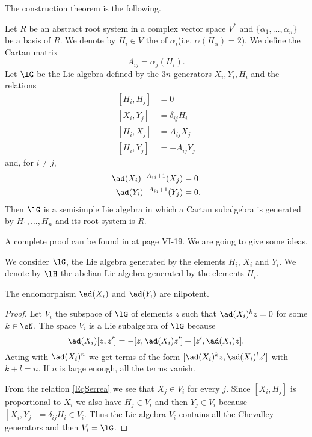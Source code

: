 The construction theorem is the following.
\begin{theorem}
	Let \( R\) be an abstract root system in a complex vector space \( V^*\) and \( \{ \alpha_1,\ldots,\alpha_n \}\) be a basis of \( R\). We denote by \( H_i\in V\) the  of \( \alpha_i\)(i.e. \( \alpha(H_{\alpha})=2\)). We define the Cartan matrix
	\begin{equation}
		A_{ij}=\alpha_j(H_i).
	\end{equation}
	Let \( \lG\) be the Lie algebra defined by the \( 3n\) generators \( X_i,Y_i,H_i\) and the relations
	\begin{subequations}
		\begin{align}
			[H_i,H_j] & =0              \\
			[X_i,Y_j] & =\delta_{ij}H_i \\
			[H_i,X_j] & =A_{ij}X_j      \\
			[H_i,Y_j] & =-A_{ij}Y_j
		\end{align}
	\end{subequations}
	and, for \( i\neq j\),
	\begin{subequations}
		\begin{align}
			\ad(X_i)^{-A_{ij}+1}(X_j) & =0        \label{EqSerrea} \\
			\ad(Y_i)^{-A_{ij}+1}(Y_j) & =0.
		\end{align}
	\end{subequations}
	Then \( \lG\) is a semisimple Lie algebra in which a Cartan subalgebra is generated by \( H_1,\ldots,H_n \) and its root system is \( R\).
\end{theorem}
A complete proof can be found in \cite{SerreSSAlgebres} at page VI-19. We are going to give some ideas.

We consider \( \lG\), the Lie algebra generated by the elements \( H_i\), \( X_i\) and \( Y_i\). We denote by \( \lH\) the abelian Lie algebra generated by the elements \( H_i\).
\begin{lemma}       \label{LemadXiNilpotent}
	The endomorphism \( \ad(X_i)\) and \( \ad(Y_i)\) are nilpotent.
\end{lemma}

\begin{proof}
	Let \( V_i\) the subspace of \( \lG\) of elements \( z\) such that \( \ad(X_i)^kz=0\) for some \( k\in\eN\). The space \( V_i\) is a Lie subalgebra of \( \lG\) because
	\begin{equation}
		\ad(X_i)[z,z']=-[z,\ad(X_i)z']+[z',\ad(X_i)z].
	\end{equation}
	Acting with \( \ad(X_i)^n\) we get terms of the form \( [\ad(X_i)^kz,\ad(X_i)^lz']\) with \( k+l=n\). If \( n\) is large enough, all the terms vanish.

	From the relation \eqref{EqSerrea} we see that \( X_j\in V_i\) for every \( j\). Since \( [X_i,H_j]\) is proportional to \( X_i\) we also have \( H_j\in V_i\) and then \( Y_j\in V_i\) because \( [X_i,Y_j]=\delta_{ij}H_i\in V_i\). Thus the Lie algebra \( V_i\) contains all the Chevalley generators and then \( V_i=\lG\).
\end{proof}

